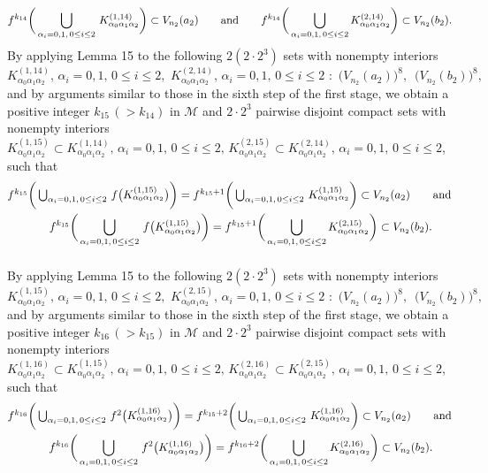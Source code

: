 \documentclass[12pt]{article}
\newcommand{\al}{\alpha}
\begin{document}
$$
f^{k_{14}}\bigg(\bigcup_{\al_i = 0, 1, \, 0 \le i \le 2} \, K_{\al_0\al_1\al_2}^{(1,14)}\bigg) \subset V_{n_2}(a_2) \qquad \text{and} \qquad f^{k_{14}}\bigg(\bigcup_{\al_i = 0, 1, \, 0 \le i \le 2} K_{\al_0\al_1\al_2}^{(2,14)}\bigg) \subset V_{n_2}(b_2).\vspace{.15in}
$$
\indent By applying Lemma 15 to the following $2(2 \cdot 2^3)$ sets with nonempty interiors 
$$
K_{\al_0\al_1\al_2}^{(1,14)}, \, \al_i = 0, 1, \, 0 \le i \le 2, \,\, K_{\al_0\al_1\al_2}^{(2,14)}, \, \al_i = 0, 1, \, 0 \le i \le 2 \,\, : \,\, \big(V_{n_2}(a_2)\big)^8, \,\,\, \big(V_{n_2}(b_2)\big)^8,
$$
and by arguments similar to those in the sixth step of the first stage, we obtain a positive integer $k_{15} \, (> k_{14})$ in $\mathcal M$ and $2 \cdot 2^3$ pairwise disjoint compact sets with nonempty interiors $K_{\al_0\al_1\al_2}^{(1,15)} \subset K_{\al_0\al_1\al_2}^{(1,14)}, \, \al_i = 0, 1, \, 0 \le i \le 2, \, K_{\al_0\al_1\al_2}^{(2,15)} \subset K_{\al_0\al_1\al_2}^{(2,14)}, \, \al_i = 0, 1, \, 0 \le i \le 2$, such that 
\begin{multline*}
$$
f^{k_{15}}\bigg(\bigcup_{\al_i = 0, 1, \, 0 \le i \le 2} \, f\big(K_{\al_0\al_1\al_2}^{(1,15)}\big)\bigg) = f^{k_{15}+1}\bigg(\bigcup_{\al_i = 0, 1, \, 0 \le i \le 2} \, K_{\al_0\al_1\al_2}^{(1,15)}\bigg) \subset V_{n_2}(a_2) \qquad \text{and} \\
\qquad f^{k_{15}}\bigg(\bigcup_{\al_i = 0, 1, \, 0 \le i \le 2} \, f\big(K_{\al_0\al_1\al_2}^{(1,15)}\big)\bigg) = f^{k_{15}+1}\bigg(\bigcup_{\al_i = 0, 1, \, 0 \le i \le 2} K_{\al_0\al_1\al_2}^{(2,15)}\bigg) \subset V_{n_2}(b_2).\vspace{.15in}
$$
\end{multline*}
\indent By applying Lemma 15 to the following $2(2 \cdot 2^3)$ sets with nonempty interiors 
$$
K_{\al_0\al_1\al_2}^{(1,15)}, \, \al_i = 0, 1, \, 0 \le i \le 2, \,\, K_{\al_0\al_1\al_2}^{(2,15)}, \, \al_i = 0, 1, \, 0 \le i \le 2 \,\, : \,\, \big(V_{n_2}(a_2)\big)^8, \,\,\, \big(V_{n_2}(b_2)\big)^8,
$$
and by arguments similar to those in the sixth step of the first stage, we obtain a positive integer $k_{16} \, (> k_{15})$ in $\mathcal M$ and $2 \cdot 2^3$ pairwise disjoint compact sets with nonempty interiors $K_{\al_0\al_1\al_2}^{(1,16)} \subset K_{\al_0\al_1\al_2}^{(1,15)}, \, \al_i = 0, 1, \, 0 \le i \le 2, \, K_{\al_0\al_1\al_2}^{(2,16)} \subset K_{\al_0\al_1\al_2}^{(2,15)}, \, \al_i = 0, 1, \, 0 \le i \le 2$, such that 
\begin{multline*}
$$
f^{k_{16}}\bigg(\bigcup_{\al_i = 0, 1, \, 0 \le i \le 2} \, f^2\big(K_{\al_0\al_1\al_2}^{(1,16)}\big)\bigg) = f^{k_{15}+2}\bigg(\bigcup_{\al_i = 0, 1, \, 0 \le i \le 2} \, K_{\al_0\al_1\al_2}^{(1,16)}\bigg) \subset V_{n_2}(a_2) \qquad \text{and} \\
\qquad f^{k_{16}}\bigg(\bigcup_{\al_i = 0, 1, \, 0 \le i \le 2} \, f^2\big(K_{\al_0\al_1\al_2}^{(1,16)}\big)\bigg) = f^{k_{16}+2}\bigg(\bigcup_{\al_i = 0, 1, \, 0 \le i \le 2} K_{\al_0\al_1\al_2}^{(2,16)}\bigg) \subset V_{n_2}(b_2).\vspace{.15in}
$$
\end{multline*}
\end{document}
